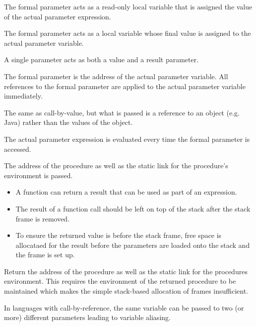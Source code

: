 The formal parameter acts as a read-only local variable that is assigned the value of the actual 
parameter expression.

The formal parameter acts as a local variable whose final value is assigned to the actual parameter 
variable.

A single parameter acts as both a value and a result parameter.

The formal parameter is the address of the actual parameter variable. All references to the formal 
parameter are applied to the actual parameter variable immediately.

The same as call-by-value, but what is passed is a reference to an object (e.g. Java) rather than 
the values of the object.

The actual parameter expression is evaluated every time the formal parameter is accessed.

The address of the procedure as well as the static link for the procedure's environment is passed.

\begin{itemize}
    \item A function can return a result that can be used as part of an expression.
    \item The result of a function call should be left on top of the stack after the stack frame 
    is removed.
    \item To ensure the returned value is before the stack frame, free space is allocataed for 
    the result before the parameters are loaded onto the stack and the frame is set up.
\end{itemize}

Return the address of the procedure as well as the static link for the procedures environment.
This requires the environment of the returned procedure to be maintained which makes the simple
stack-based allocation of frames insufficient.

In languages with call-by-reference, the same variable can be passed to two (or more) different
parameters leading to variable aliasing.

